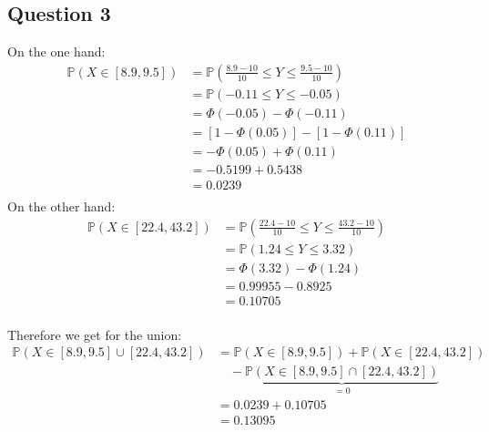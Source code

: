 \documentclass{article}
\renewcommand{\P}{\mathbb{P}}
\begin{document}
\subsection{Question 3}
On the one hand:
\begin{align*}
    \P(X \in [8.9, 9.5])
     & =
    \P(\frac{8.9 - 10}{10} \leq Y \leq \frac{9.5 - 10}{10})       \\
     & =
    \P(-0.11 \leq Y \leq -0.05)                                   \\
     & =
    \Phi(-0.05) - \Phi(-0.11)                                     \\
     & =
    \left[ 1 - \Phi(0.05) \right] - \left[ 1 - \Phi(0.11) \right] \\
     & =
    - \Phi(0.05) + \Phi(0.11)                                     \\
     & =
    - 0.5199 + 0.5438                                             \\
     & =
    0.0239                                                        \\
\end{align*}
On the other hand:
\begin{align*}
    \P(X \in [22.4, 43.2])
     & =
    \P(\frac{22.4 - 10}{10} \leq Y \leq \frac{43.2 - 10}{10}) \\
     & =
    \P(1.24 \leq Y \leq 3.32)                                 \\
     & =
    \Phi(3.32) - \Phi(1.24)                                   \\
     & =
    0.99955 - 0.8925                                          \\
     & =
    0.10705                                                   \\
\end{align*}

Therefore we get for the union:
\begin{align*}
    \P(X \in [8.9, 9.5] \cup [22.4, 43.2])
    &=
    \P(X \in [8.9, 9.5]) + \P(X \in [22.4, 43.2]) \\
    & \quad - \underbrace{\P(X \in [8.9, 9.5] \cap [22.4, 43.2])}_{=0} \\
    &=
    0.0239 + 0.10705 \\
    &=
    0.13095 \\
\end{align*}
\end{document}
